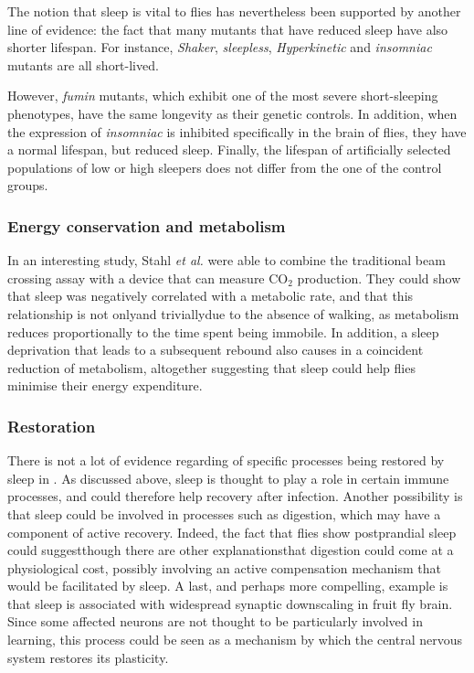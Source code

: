 The notion that sleep is vital to flies has nevertheless been supported by another line of evidence: the fact that many mutants that have reduced sleep have also shorter lifespan\cite{cirelli_is_2008}.
For instance, \emph{Shaker}\cite{cirelli_reduced_2005}, 
\emph{sleepless}\cite{koh_identification_2008},
\emph{Hyperkinetic}\cite{bushey_sleep_2011} and
\emph{insomniac}\cite{stavropoulos_insomniac_2011} mutants are all short-lived.

However, \emph{fumin} mutants, which exhibit one of the most severe short-sleeping phenotypes, have the same longevity as their genetic controls\cite{kume_dopamine_2005}.
In addition, when the expression of \emph{insomniac} is inhibited specifically in the brain of flies, they have a normal lifespan, but reduced sleep\cite{stavropoulos_insomniac_2011}.
Finally, the lifespan of artificially selected populations of low or high sleepers does not differ from the one of the control groups\cite{harbison_selection_2017}.


\subsubsection{Energy conservation and metabolism}

In an interesting study, Stahl \emph{et al.} were able to combine the traditional beam crossing assay with a device that can measure CO$_2$ production\cite{stahl_sleep-dependent_2017}. 
They could show that sleep was negatively correlated with a metabolic rate, 
and that this relationship is not only\emd{}and trivially\emd{}due to the absence of walking, 
as metabolism reduces proportionally to the time spent being immobile.
In addition, a sleep deprivation that leads to a subsequent rebound also causes in a coincident reduction of metabolism,
altogether suggesting that sleep could help flies minimise their energy expenditure.


\subsubsection{Restoration}
There is not a lot of evidence regarding of specific processes being restored by sleep in \droso{}.
As discussed above, sleep is thought to play a role in certain immune processes, and could therefore help recovery
after infection\cite{kuo_sleep_2010,kuo_increased_2014}.
Another possibility is that sleep could be involved in processes such as digestion, which may have a component of active recovery. Indeed, the fact that flies show postprandial sleep\cite{murphy_postprandial_2016} could suggest\emd{}though there are other explanations\emd{}that digestion could come at a physiological cost, possibly involving an active compensation mechanism that would be facilitated by sleep.
A last, and perhaps more compelling, example is that sleep is associated with widespread synaptic downscaling in fruit fly brain\cite{gilestro_widespread_2009}. 
Since some affected neurons are not thought to be particularly involved in learning, this process could be seen as a mechanism by which the central nervous system restores its plasticity.

